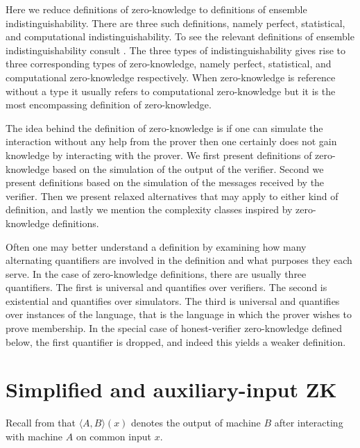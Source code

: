 \begin{define}
    \newcommand\ppt{\text{probabilistic polynomial-time}}    
\end{define}

Here we reduce definitions of zero-knowledge to definitions of ensemble indistinguishability.
There are three such definitions, namely perfect, statistical, and computational indistinguishability.
To see the relevant definitions of ensemble indistinguishability consult .
The three types of indistinguishability gives rise to three corresponding types of zero-knowledge, namely perfect, statistical, and computational zero-knowledge respectively.
When zero-knowledge is reference without a type it usually refers to computational zero-knowledge but it is the most encompassing definition of zero-knowledge.

The idea behind the definition of zero-knowledge is if one can simulate the interaction without any help from the prover then one certainly does not gain knowledge by interacting with the prover.
We first present definitions of zero-knowledge based on the simulation of the output of the verifier.
Second we present definitions based on the simulation of the messages received by the verifier.
Then we present relaxed alternatives that may apply to either kind of definition, and lastly we mention the complexity classes inspired by zero-knowledge definitions.

Often one may better understand a definition by examining how many alternating quantifiers are involved in the definition and what purposes they each serve.
In the case of zero-knowledge definitions, there are usually three quantifiers.
The first is universal and quantifies over verifiers.
The second is existential and quantifies over simulators.
The third is universal and quantifies over instances of the language, that is the language in which the prover wishes to prove membership.
In the special case of honest-verifier zero-knowledge defined below, the first quantifier is dropped, and indeed this yields a weaker definition.


\section{Simplified and auxiliary-input ZK}

Recall from  that $\langle A, B \rangle(x)$ denotes the output of machine $B$ after interacting with machine $A$ on common input $x$. 

